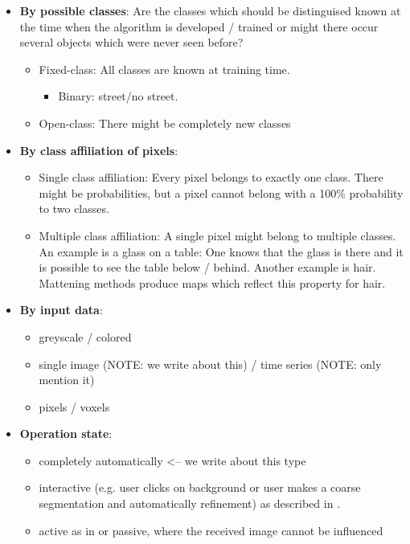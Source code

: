 \begin{itemize}
    \item \textbf{By possible classes}: Are the classes which should be distinguised
          known at the time when the algorithm is developed / trained or might
          there occur several objects which were never seen before?
          \begin{itemize}
              \item Fixed-class: All classes are known at training time.
                    \begin{itemize}
                        \item Binary: street/no street.
                    \end{itemize}
              \item Open-class: There might be completely new classes
          \end{itemize}
    \item \textbf{By class affiliation of pixels}:
          \begin{itemize}
              \item Single class affiliation: Every pixel belongs to exactly one class. There might
                    be probabilities, but a pixel cannot belong with a 100\%
                    probability to two classes.
              \item Multiple class affiliation: A single pixel might belong to
                    multiple classes. An example is a glass on a table: One
                    knows that the glass is there and it is possible to see the
                    table below / behind. Another example is hair. Mattening
                    methods produce maps which reflect this property for hair.\cite{levin2008spectral}
          \end{itemize}
    \item \textbf{By input data}:
          \begin{itemize}
              \item greyscale / colored
              \item single image (NOTE: we write about this) / time series (NOTE: only mention it)
              \item pixels / voxels \cite{wolz2012multi}
          \end{itemize}
    \item \textbf{Operation state}:
          \begin{itemize}
              \item completely automatically <-- we write about this type
              \item interactive (e.g. user clicks on background or user makes a
                    coarse segmentation and automatically refinement) as
                    described in
                    \cite{protiere2007interactive,rother2004grabcut}.
              \item active as in
                    \cite{schiebener2011segmentation,schiebener2012discovery} or
                    passive, where the received image cannot be influenced
          \end{itemize}
\end{itemize}

